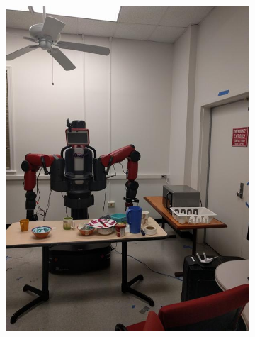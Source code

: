 \documentclass[12pt]{article}
\begin{document}
\begin{figure}[t!]
\begin{subfigure}[t]{0.1\textwidth}
        \includegraphics[width=\linewidth]{../Images/Set3/5}
    \end{subfigure}
    \begin{subfigure}[t]{0.1\textwidth}
        \centering

\end{subfigure}
\end{figure}
\end{document}
